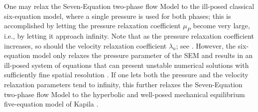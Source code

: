 \documentclass[preprint,10pt]{elsarticle}
\begin{document}
One may relax the Seven-Equation two-phase flow Model to
the ill-posed classical six-equation model, where a single pressure 
is used for both phases; this is
accomplished by letting the pressure relaxation coefficient $\mu_P$ become
very large, i.e., by letting it approach infinity.  Note that as the pressure
relaxation coefficient increases, so should the velocity
relaxation coefficient $\lambda_u$; see . 
However, the six-equation model only relaxes the pressure parameter of the SEM and results
in an ill-posed system of equations that can present unstable numerical solutions
with sufficiently fine spatial resolution \cite{SEM,Herrard_2005}. 
%
If one lets both the pressure and the velocity relaxation parameters tend to infinity, this further relaxes the
Seven-Equation two-phase flow Model to the hyperbolic and well-posed 
mechanical equilibrium five-equation model of Kapila \cite{Kapila_2001}.  
\end{document}
